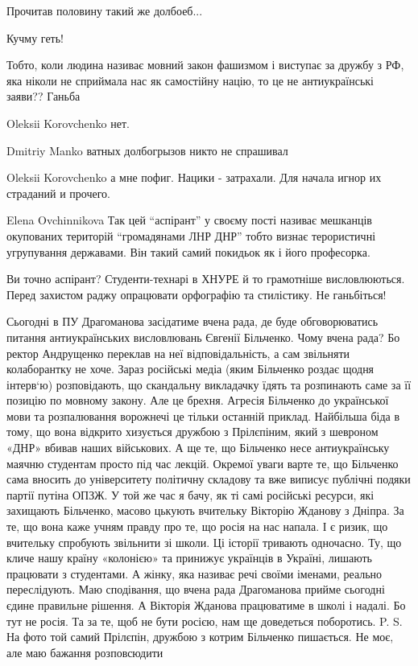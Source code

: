 \begin{itemize}
Прочитав половину такий же долбоеб...

Кучму геть!


Тобто, коли людина називає мовний закон фашизмом і виступає за дружбу з РФ, яка
ніколи не сприймала нас як самостійну націю, то це не антиукраїнські заяви??
Ганьба


Oleksii Korovchenko нет.


Dmitriy Manko ватных долбогрызов никто не спрашивал


Oleksii Korovchenko а мне пофиг. Нацики - затрахали. Для начала игнор их страданий и прочего.


Elena Ovchinnikova Так цей \enquote{аспірант} у своєму пості називає мешканців
окупованих територій \enquote{громадянами ЛНР ДНР} тобто визнає терористичні
угрупування державами. Він такий самий покидьок як і його професорка.


Ви точно аспірант? Студенти-технарі в ХНУРЕ й то грамотніше висловлюються. Перед захистом раджу опрацювати орфографію та стилістику. Не ганьбіться!


\obeycr
Сьогодні в ПУ Драгоманова засідатиме вчена рада, де буде обговорюватись питання антиукраїнських висловлювань Євгенії Більченко.
Чому вчена рада?
Бо ректор Андрущенко переклав на неї відповідальність, а сам звільняти колаборантку не хоче.
Зараз російські медіа (яким Більченко роздає щодня інтерв‘ю) розповідають, що скандальну викладачку їдять та розпинають саме за її позицію по мовному закону.
Але це брехня.
Агресія Більченко до української мови та розпалювання ворожнечі це тільки останній приклад.
Найбільша біда в тому, що вона відкрито хизується дружбою з Прілєпіним, який з шевроном «ДНР» вбивав наших військових.
А ще те, що Більченко несе антиукраїнську маячню студентам просто під час лекцій.
Окремої уваги варте те, що Більченко сама вносить до університету політичну складову та вже виписує публічні подяки партії путіна ОПЗЖ.
У той же час я бачу, як ті самі російські ресурси, які захищають Більченко, масово цькують вчительку Вікторію Жданову з Дніпра.
За те, що вона каже учням правду про те, що росія на нас напала.
І є ризик, що вчительку спробують звільнити зі школи.
Ці історії тривають одночасно.
Ту, що кличе нашу країну «колонією» та принижує українців в Україні, лишають працювати з студентами.
А жінку, яка називає речі своїми іменами, реально переслідують.
Маю сподівання, що вчена рада Драгоманова прийме сьогодні єдине правильне рішення.
А Вікторія Жданова працюватиме в школі і надалі.
Бо тут не росія.
Та за те, щоб не бути росією, нам ще доведеться поборотись.
P. S. На фото той самий Прілєпін, дружбою з котрим Більченко пишається.
Не моє, але маю бажання розповсюдити
\restorecr


\end{itemize}
